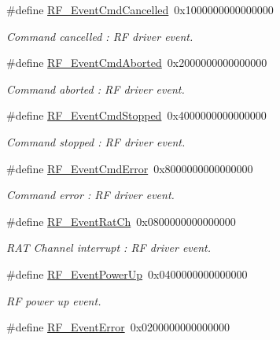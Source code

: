 \begin{DoxyCompactItemize}
\item 
\#define \hyperlink{group___r_f___driver___events_gae6d21f9806a7482a0f324f98bb83aac0}{R\+F\+\_\+\+Event\+Cmd\+Cancelled}~0x1000000000000000
\begin{DoxyCompactList}\small\item\em Command cancelled \+: R\+F driver event. \end{DoxyCompactList}\item 
\#define \hyperlink{group___r_f___driver___events_ga95a0bf832c19fbdce2c164144ad265ee}{R\+F\+\_\+\+Event\+Cmd\+Aborted}~0x2000000000000000
\begin{DoxyCompactList}\small\item\em Command aborted \+: R\+F driver event. \end{DoxyCompactList}\item 
\#define \hyperlink{group___r_f___driver___events_gac68cfb0f9c26d275ad990f5da9e6b91f}{R\+F\+\_\+\+Event\+Cmd\+Stopped}~0x4000000000000000
\begin{DoxyCompactList}\small\item\em Command stopped \+: R\+F driver event. \end{DoxyCompactList}\item 
\#define \hyperlink{group___r_f___driver___events_ga8255e5773828977cb205fd1f856e710e}{R\+F\+\_\+\+Event\+Cmd\+Error}~0x8000000000000000
\begin{DoxyCompactList}\small\item\em Command error \+: R\+F driver event. \end{DoxyCompactList}\item 
\#define \hyperlink{group___r_f___driver___events_gab0302093e17c587cc4bf2c928c79960e}{R\+F\+\_\+\+Event\+Rat\+Ch}~0x0800000000000000
\begin{DoxyCompactList}\small\item\em R\+A\+T Channel interrupt \+: R\+F driver event. \end{DoxyCompactList}\item 
\#define \hyperlink{group___r_f___driver___events_ga0e6d5e7d3760a65ba37d8f26823e9a0a}{R\+F\+\_\+\+Event\+Power\+Up}~0x0400000000000000
\begin{DoxyCompactList}\small\item\em R\+F power up event. \end{DoxyCompactList}\item 
\#define \hyperlink{group___r_f___driver___events_gaa6b858b8b383210049fa3f17dcd95fac}{R\+F\+\_\+\+Event\+Error}~0x0200000000000000

\end{DoxyCompactItemize}
